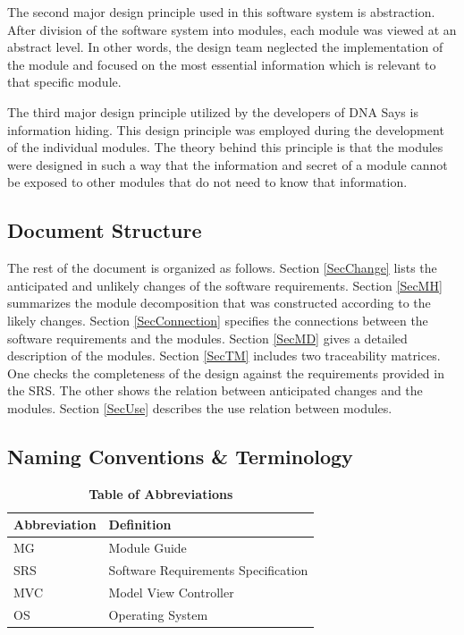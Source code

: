 \documentclass[12pt, titlepage]{article}
\begin{document}
\par The second major design principle used in this software system is abstraction. After division of the software system into modules, each module was viewed at an abstract level. In other words, the design team neglected the implementation of the module and focused on the most essential information which is relevant to that specific module.  \\

\par The third major design principle utilized by the developers of DNA Says is information hiding. This design principle was employed during the development of the individual modules. The theory behind this principle is that the modules were designed in such a way that the information and secret of a module cannot be exposed to other modules that do not need to know that information.



\subsection{Document Structure}


The rest of the document is organized as follows. Section
\ref{SecChange} lists the anticipated and unlikely changes of the software
requirements. Section \ref{SecMH} summarizes the module decomposition that
was constructed according to the likely changes. Section \ref{SecConnection}
specifies the connections between the software requirements and the
modules. Section \ref{SecMD} gives a detailed description of the
modules. Section \ref{SecTM} includes two traceability matrices. One checks
the completeness of the design against the requirements provided in the SRS. The
other shows the relation between anticipated changes and the modules. Section
\ref{SecUse} describes the use relation between modules.

\subsection{Naming Conventions \& Terminology}

\begin{table}[hbp]
\caption{\textbf{Table of Abbreviations}} \label{Table}
\begin{tabularx}{\textwidth}{p{3cm}X}
\toprule
\textbf{Abbreviation} & \textbf{Definition} \\
\midrule
MG & Module Guide\\
SRS & Software Requirements Specification\\
MVC & Model View Controller\\
OS & Operating System\\
\bottomrule
\end{tabularx}
\end{table}
\end{document}
